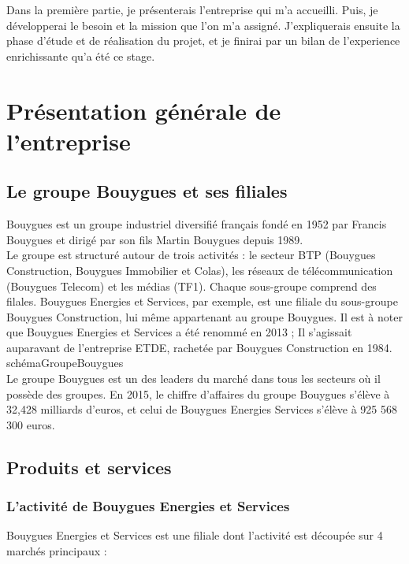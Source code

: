 \documentclass[a4paper]{article}
\begin{document}
    Dans la première partie, je présenterais l'entreprise qui m'a accueilli. Puis, je développerai le besoin et la mission que l'on m'a assigné. J'expliquerais ensuite la phase d'étude et de réalisation du projet, et je finirai par un bilan de l'experience enrichissante qu'a été ce stage. \\

    \newpage 
    \section{Présentation générale de l'entreprise}

    \subsection{Le groupe Bouygues et ses filiales}

    Bouygues est un groupe industriel diversifié français fondé en 1952 par Francis Bouygues et dirigé par son fils Martin Bouygues depuis 1989. \\

    Le groupe est structuré autour de trois activités : le secteur BTP (Bouygues Construction,
Bouygues Immobilier et Colas), les réseaux de télécommunication (Bouygues Telecom) et les médias (TF1). Chaque sous-groupe comprend des filales. Bouygues Energies et Services, par exemple, est une filiale du sous-groupe Bouygues Construction, lui même appartenant au groupe Bouygues. Il est à noter que Bouygues Energies et Services a été renommé en 2013 ; Il s'agissait auparavant de l'entreprise ETDE, rachetée par Bouygues Construction en 1984. \\

    schémaGroupeBouygues \\
    
    Le groupe Bouygues est un des leaders du marché dans tous les secteurs où il possède des groupes. En 2015, le chiffre d’affaires du groupe Bouygues s’élève à 32,428 milliards d’euros, et celui de Bouygues Energies Services s'élève à 925 568 300 euros. \\

    \subsection{Produits et services}
 
    \subsubsection{L'activité de Bouygues Energies et Services}
    Bouygues Energies et Services est une filiale dont l'activité est découpée sur 4 marchés principaux : \\
    
\end{document}
